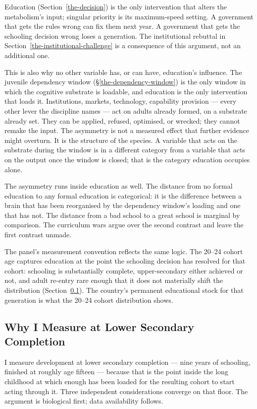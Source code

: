 \documentclass[12pt,letterpaper]{article}
\begin{document}
Education (Section~\ref{the-decision}) is the only intervention
that alters the metabolism's input; singular priority is its
maximum-speed setting. A government that
gets the rules wrong can fix them next year. A government that gets
the schooling decision wrong loses a generation. The institutional
rebuttal in Section~\ref{the-institutional-challenge} is a
consequence of this argument, not an additional one.

This is also why no other variable has, or can have, education's
influence. The juvenile dependency window
(\S\ref{the-dependency-window}) is the only window in which the
cognitive substrate is loadable, and education is the only
intervention that loads it. Institutions, markets, technology,
capability provision --- every other lever the discipline names ---
act on adults already formed, on a substrate already set. They can
be applied, refused, optimised, or wrecked; they cannot remake the
input. The asymmetry is not a measured effect that further evidence
might overturn. It is the structure of the species. A variable that
acts on the substrate during the window is in a different category
from a variable that acts on the output once the window is closed;
that is the category education occupies alone.

The asymmetry runs inside education as well. The distance from no
formal education to any formal education is categorical: it is the
difference between a brain that has been reorganised by the
dependency window's loading and one that has not. The distance from
a bad school to a great school is marginal by comparison. The
curriculum wars argue over the second contrast and leave the first
contrast unmade.

The panel's measurement convention reflects the same logic. The
20--24 cohort age captures education at the point the schooling
decision has resolved for that cohort: schooling is substantially
complete, upper-secondary either achieved or not, and adult re-entry
rare enough that it does not materially shift the distribution
(Section~\ref{why-lower-secondary-completion}). The country's permanent
educational stock for that generation is what the 20--24 cohort
distribution shows.

\subsection{Why I Measure at Lower Secondary Completion}\label{why-lower-secondary-completion}

I measure development at lower secondary completion --- nine years
of schooling, finished at roughly age fifteen --- because that is
the point inside the long childhood at which enough has been loaded
for the resulting cohort to start acting through it. Three
independent considerations converge on that floor. The
argument is biological first; data availability follows.
\end{document}
